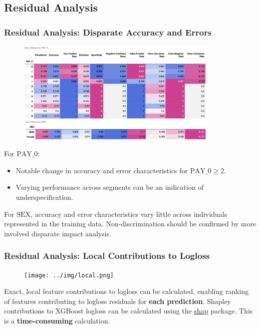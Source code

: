 \documentclass[11pt,
               aspectratio=169,
               hyperref={colorlinks}
               ]{beamer}
\begin{document}
		\subsection{Residual Analysis}

			\begin{frame}[t]
		
				\frametitle{\textbf{Residual Analysis}: Disparate Accuracy and Errors}
		
		                 \vspace{-10pt}
				\begin{figure}
					\begin{center}
						\includegraphics[height=140pt]{../img/de.png}
					\end{center}
				\end{figure}
				\vspace{-15pt}
				\tiny For $\text{PAY\_0}$:
				\begin{itemize}
					\item Notable change in accuracy and error characteristics for $\text{PAY\_0} \geq 2$. 
					\item Varying performance across segments can be an indication of underspecification. 
				\end{itemize}
				For $\text{SEX}$, accuracy and error characteristics vary little across individuals represented in the training data. Non-discrimination should be confirmed by more involved disparate impact analysis.
		
			\end{frame}

			\begin{frame}
	
				\frametitle{\textbf{Residual Analysis}: Local Contributions to Logloss}
	
				\begin{figure}
					\begin{center}
						\texttt{[image: ../img/local.png]}
					\end{center}
				\end{figure}	
				\scriptsize{Exact, local feature contributions to logloss can be calculated, enabling ranking of features contributing to logloss residuals for \textbf{each prediction}. Shapley contributions to XGBoost logloss can be calculated using the \href{https://github.com/slundberg/shap}{shap} package. This is a \textbf{time-consuming} calculation.}
				
			\end{frame}
\end{document}
